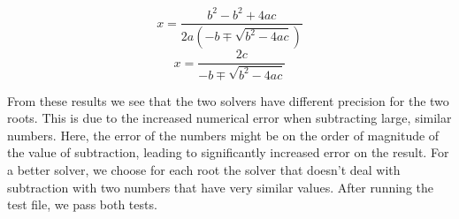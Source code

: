 \documentclass[11pt]{article}
\begin{document}
$$x=\frac{b^2-b^2+4ac}{2a(-b\mp\sqrt{b^2-4ac})}$$
$$x=\frac{2c}{-b \mp \sqrt{b^2-4ac}}$$



From these results we see that the two solvers have different precision for the two roots. This is due to the increased numerical error when subtracting large, similar numbers. Here, the error of the numbers might be on the order of magnitude of the value of subtraction, leading to significantly increased error on the result. For a better solver, we choose for each root the solver that doesn't deal with subtraction with two numbers that have very similar values. After running the test file, we pass both tests.
\end{document}
